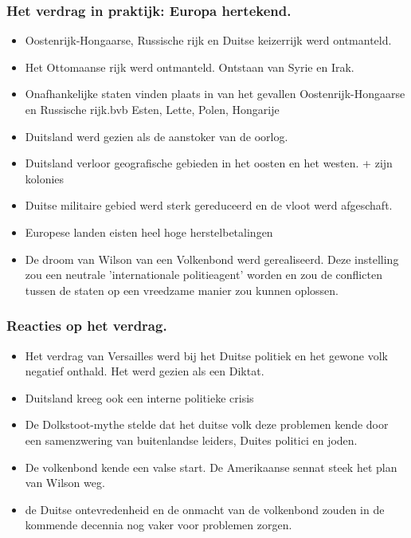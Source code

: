 \documentclass{article}
\begin{document}
\subsubsection{Het verdrag in praktijk: Europa hertekend.}
\begin{itemize}
    \item Oostenrijk-Hongaarse, Russische rijk en Duitse keizerrijk werd ontmanteld.
    \item Het Ottomaanse rijk werd ontmanteld. Ontstaan van Syrie en Irak.
    \item Onafhankelijke staten vinden plaats in van het gevallen Oostenrijk-Hongaarse en Russische rijk.bvb Esten, Lette, Polen, Hongarije
    \item Duitsland werd gezien als de aanstoker van de oorlog.
    \item Duitsland verloor geografische gebieden in het oosten en het westen. + zijn kolonies
    \item Duitse militaire gebied werd sterk gereduceerd en de vloot werd afgeschaft.
    \item Europese landen eisten heel hoge herstelbetalingen
    \item De droom van Wilson van een Volkenbond werd gerealiseerd. Deze instelling zou een neutrale 'internationale politieagent' worden 
    en zou de conflicten tussen de staten op een vreedzame manier zou kunnen oplossen.
    
\end{itemize}

\subsubsection{Reacties op het verdrag.}
\begin{itemize}
    \item Het verdrag van Versailles werd bij het Duitse politiek en het gewone volk negatief onthald. Het werd gezien als een Diktat.
    \item Duitsland kreeg ook een interne politieke crisis
    \item De Dolkstoot-mythe stelde dat het duitse volk deze problemen kende door een samenzwering van buitenlandse leiders, Duites politici en joden.
    \item De volkenbond kende een valse start. De Amerikaanse sennat steek het plan van Wilson weg.
    \item de Duitse ontevredenheid en de onmacht van de volkenbond zouden in de kommende decennia nog vaker voor problemen zorgen.
\end{itemize}
\end{document}
